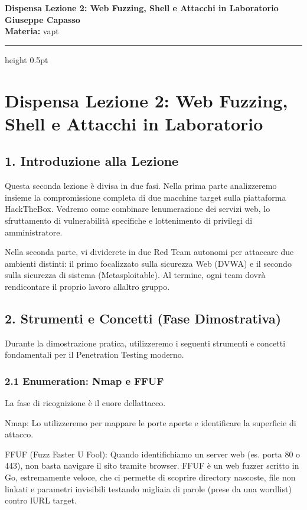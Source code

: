 \documentclass[11pt,a4paper]{article}
\newcommand{\proposaltitle}[1]{
    \begin{center}
        \vspace*{0.1cm}
        {\LARGE \bfseries \color{blue} #1} \\[1.5ex]
        {\large \textbf{Giuseppe Capasso}} \\[1ex]
                \small{
            \vspace{0.1cm}
            \textbf{Materia:} vapt\\
        }
            \end{center}
    \vspace{0.3cm}
    \hrule height 0.5pt
    \vspace{0.5cm}
}
\begin{document}
\proposaltitle{Dispensa Lezione 2: Web Fuzzing, Shell e Attacchi in Laboratorio}

\section{Dispensa Lezione 2: Web Fuzzing, Shell e Attacchi in
Laboratorio}\label{dispensa-lezione-2-web-fuzzing-shell-e-attacchi-in-laboratorio}

\subsection{1. Introduzione alla
Lezione}\label{introduzione-alla-lezione}

Questa seconda lezione è divisa in due fasi. Nella prima parte
analizzeremo insieme la compromissione completa di due macchine target
sulla piattaforma HackTheBox. Vedremo come combinare
l\textquotesingle enumerazione dei servizi web, lo sfruttamento di
vulnerabilità specifiche e l\textquotesingle ottenimento di privilegi di
amministratore.

Nella seconda parte, vi dividerete in due Red Team autonomi per
attaccare due ambienti distinti: il primo focalizzato sulla sicurezza
Web (DVWA) e il secondo sulla sicurezza di sistema (Metasploitable). Al
termine, ogni team dovrà rendicontare il proprio lavoro
all\textquotesingle altro gruppo.

\subsection{2. Strumenti e Concetti (Fase
Dimostrativa)}\label{strumenti-e-concetti-fase-dimostrativa}

Durante la dimostrazione pratica, utilizzeremo i seguenti strumenti e
concetti fondamentali per il Penetration Testing moderno.

\subsubsection{2.1 Enumeration: Nmap e
FFUF}\label{enumeration-nmap-e-ffuf}

La fase di ricognizione è il cuore dell\textquotesingle attacco.

Nmap: Lo utilizzeremo per mappare le porte aperte e identificare la
superficie di attacco.

FFUF (Fuzz Faster U Fool): Quando identifichiamo un server web (es.
porta 80 o 443), non basta navigare il sito tramite browser. FFUF è un
web fuzzer scritto in Go, estremamente veloce, che ci permette di
scoprire directory nascoste, file non linkati e parametri invisibili
testando migliaia di parole (prese da una wordlist) contro
l\textquotesingle URL target.
\end{document}
